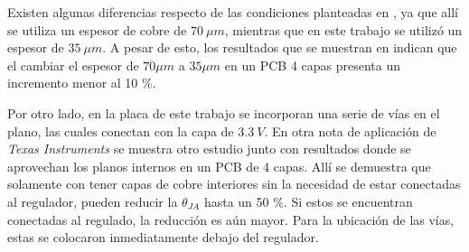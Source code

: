 


Existen algunas diferencias respecto de las condiciones planteadas en \cite{AN1028_thermal}, ya que allí se utiliza un espesor de cobre de $70 \ \mu m$, mientras que en este trabajo se utilizó un espesor de $35 \ \mu m$. A pesar de esto, los resultados que se muestran en \cite{ROHM_thermal} indican que el cambiar el espesor de $70 \mu m$ a $35 \mu m$ en un PCB 4 capas presenta un incremento menor al 10 \%.

Por otro lado, en la placa de este trabajo se incorporan una serie de vías en el plano, las cuales conectan con la capa de $3.3 \ V$. En otra nota de aplicación de \textit{Texas Instruments} \cite{SLVAE85} se muestra otro estudio junto con resultados donde se aprovechan los planos internos en un PCB de 4 capas. Allí se demuestra que solamente con tener capas de cobre interiores sin la necesidad de estar conectadas al regulador, pueden reducir la $\theta_{JA}$ hasta un 50 \%. Si estos se encuentran conectadas al regulado, la reducción es aún mayor. Para la ubicación de las vías, estas se colocaron inmediatamente debajo del regulador.




